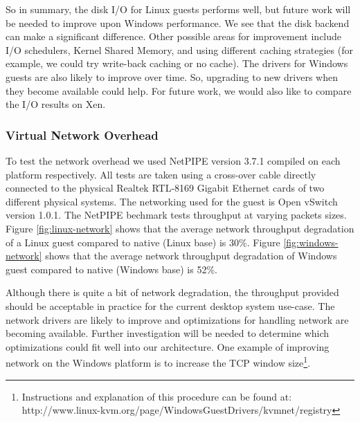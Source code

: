 So in summary, the disk I/O for Linux guests performs well, but future work will be needed to improve upon Windows performance. We see that the disk backend can make a significant difference. Other possible areas for improvement include I/O schedulers, Kernel Shared Memory, and using different caching strategies (for example, we could try write-back caching or no cache). The drivers for Windows guests are also likely to improve over time. So, upgrading to new drivers when they become available could help. For future work, we would also like to compare the I/O results on Xen.

\pagebreak

\subsubsection{Virtual Network Overhead}

To test the network overhead we used NetPIPE version 3.7.1 compiled on each platform respectively. All tests are taken using a cross-over cable directly connected to the physical Realtek RTL-8169 Gigabit Ethernet cards of two different physical systems. The networking used for the guest is Open vSwitch version 1.0.1. The NetPIPE bechmark tests throughput at varying packets sizes. Figure \ref{fig:linux-network} shows that the average network throughput degradation of a Linux guest compared to native (Linux base) is 30\%. Figure \ref{fig:windows-network} shows that the average network throughput degradation of Windows guest compared to native (Windows base) is 52\%.


Although there is quite a bit of network degradation, the throughput provided should be acceptable in practice for the current desktop system use-case. The network drivers are likely to improve and optimizations for handling network are becoming available. Further investigation will be needed to determine which optimizations could fit well into our architecture. One example of improving network on the Windows platform is to increase the TCP window size\footnote{Instructions and explanation of this procedure can be found at:  http://www.linux-kvm.org/page/WindowsGuestDrivers/kvmnet/registry}.

